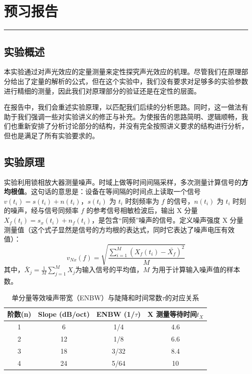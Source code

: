 
\clearpage
\setcounter{section}{0}
\section{预习报告}
\vspace{-0.7cm} %
\noindent\textcolor{fgraygreen}{\rule{0.382\textwidth}{2pt} }
\vspace{7pt}

\subsection{实验概述}

本实验通过对声光效应的定量测量来定性探究声光效应的机理。尽管我们在原理部分给出了定量的解析的公式，但在这个实验中，我们没有要求对足够多的实验参数进行精细的测量，因此我们对原理部分的验证还是在定性的层面。

在报告中，我们会重述实验原理，以匹配我们后续的分析思路。同时，这一做法有助于我们强调一些对实验讲义的修正与补充。为使报告的思路简明、逻辑顺畅，我们也重新安排了分析讨论部分的结构，并没有完全按照讲义要求的结构进行分析，但也是满足了所有实验要求的。

\subsection{实验原理}

实验利用锁相放大器测量噪声。时域上做等时间间隔采样，多次测量计算信号的\textbf{方均根值}。这句话的意思是：设备在等间隔的时间点上读取一个信号 $v(t_i) = s(t_i) + n(t_i)$，$s(t_i)$ 为 $t_i$ 时刻频率为 $f$ 的信号，$n(t_i)$ 为 $t_i$ 时刻的噪声，经与信号同频率 $f$ 的参考信号相敏检波后，输出 X 分量$X_f(t_i) = s_x(t_i) + n_f(t_i)$，是包含“同频”噪声的信号。定义噪声强度 X 分量测量值（这个式子显然是信号的方均根的表达式，同时它表达了噪声电压有效值）：
\[
v_{Nx}(f) = \sqrt{\frac{\sum_{i=1}^{M} \left(X_f(t_i) - \bar{X_f}\right)^2}{M}}
\]
其中，$\bar{X}_j = \frac{1}{M} \sum_{j=1}^{M} X_j$为输入信号的平均值，$M$ 为用于计算输入噪声值的样本数。

\begin{table}[h!]
	\centering
	\caption{单分量等效噪声带宽（ENBW）与陡降和时间常数$\tau$的对应关系}
	\label{tab:ENBW}
	\begin{tabular}{cccc}
		\hline
		\textbf{阶数(n)} & \textbf{Slope (dB/oct)} & \textbf{ENBW (1/$\tau$)} & \textbf{X 测量等待时间$t_X$}\\
		\hline
		1 & 6 & 1/4 & 4.6 \\
		2 & 12 & 1/8 & 6.6 \\
		3 & 18 & 3/32 & 8.4 \\
		4 & 24 & 5/64 & 10 \\
		\hline
	\end{tabular}
\end{table}

